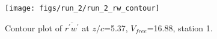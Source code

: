 \begin{figure}[H]
\centering
\texttt{[image: figs/run\_2/run\_2\_rw\_contour]}
\caption{Contour plot of $\overline{r^\prime w^\prime}$ at $z/c$=5.37, $V_{free}$=16.88, station 1.}
\label{fig:run_2_rw_contour}
\end{figure}


